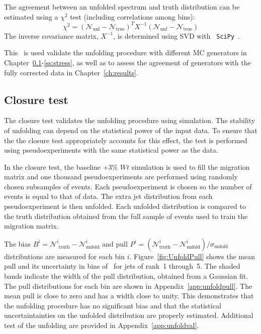
The agreement between an unfolded spectrum and truth distribution can be estimated using a $\chi^2$ test (including correlations among bins):
\begin{equation}
\chi^2= \left( {\mathscr N}_{\textrm {unf}}- {\mathscr N}_{\textrm {true}} \right)^{T} X^{-1}\left( {\mathscr N}_{\textrm {unf}}- {\mathscr N}_{\textrm {true}} \right)
\label{eq:unfchi2}
\end{equation}
 The inverse covariance matrix, $X^{-1}$, is determined using SVD with \texttt{ SciPy}~\cite{scipy}.

This \chisq\ is used validate the unfolding procedure with different MC generators in Chapter~\ref{ss:close}-\ref{ss:stress}, as well as to assess the agreement of generators with the fully corrected data in Chapter~\ref{ch:results}.
\subsection{Closure test}
\label{ss:close}
The closure test validates the unfolding procedure using simulation. The stability of unfolding can depend on the statistical power of the input data. To ensure that the the closure test appropriately accounts for this effect, the test is performed using pseudoexperiments with the same statistical power as the data.

In the closure test, the baseline \ttbar+3\% $Wt$ simulation is used to fill the migration matrix and
one thousand pseudoexperiments are performed using randomly chosen subsamples of events.  Each pseudoexperiment is chosen
so the number of events is equal to that of data. 
The extra jet distribution from each pseudoexperiment is then unfolded.  Each unfolded distribution is 
compared to the truth distribution obtained from the full sample of events used to train the migration matrix. 

The bias $B^i={\mathscr N}^i_{\textrm{ truth}}-{\mathscr N}^i_{\textrm{unfold}}$ and 
pull $P^i=({\mathscr N}^i_{\textrm{truth}}-{\mathscr N}^i_{\textrm{unfold}})/\sigma_{\textrm {unfold}}$ 
distributions are measured for each bin $i$. 
Figure~\ref{fig:UnfoldPull} shows the mean pull and its uncertainty in bins of \pT\ for jets of rank~1 through~5.  The shaded bands indicate
the width of the pull distribution, obtained from a Gaussian fit.
The pull distributions for each bin are shown in Appendix~\ref{app:unfoldpull}. 
The mean pull is close to zero and has a width close to unity.  This demonstrates that the unfolding procedure has no 
significant bias and that the statistical uncertaintainties on the unfolded distribution are properly estimated. Additional test of the unfolding are provided in Appendix~\ref{app:unfoldval}. 

